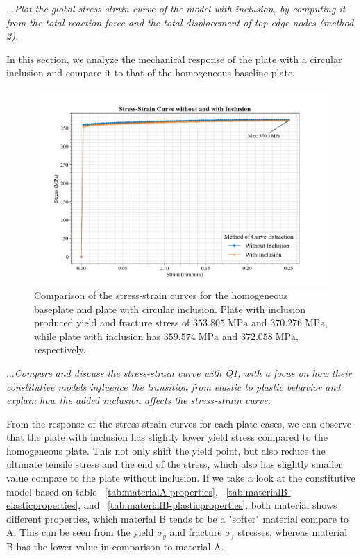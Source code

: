 \documentclass[12pt]{article}
\begin{document}
\textit{$\dots$Plot the global stress-strain curve of the model with inclusion, by computing it from the total
reaction force and the total displacement of top edge nodes (method 2).}
\vspace{1em}

In this section, we analyze the mechanical response of the plate with a circular inclusion and compare it to that of the homogeneous baseline plate.

\begin{figure}[H]
    \centering
    \includegraphics[width=1\textwidth]{visualize_tensileGraph/res/comparison_inclusion_non.png}
    \caption{Comparison of the stress-strain curves for the homogeneous baseplate and plate with circular
    inclusion. Plate with inclusion produced yield and fracture stress of $353.805 \; \text{MPa}$ and $370.276\; \text{MPa}$,
    while plate with inclusion has $359.574\; \text{MPa}$ and $372.058\; \text{MPa}$, respectively.}
    \label{fig:ComparisonInclusion}
\end{figure}


\textit{$\dots$Compare and discuss the stress-strain curve with Q1, with a focus on how their constitutive
models influence the transition from elastic to plastic behavior and explain how the added
inclusion affects the stress-strain curve.}
\vspace{1em}


\hspace{2em}From the response of the stress-strain curves for each plate cases, we can observe that the plate with inclusion
has slightly lower yield stress compared to the homogeneous plate. This not only shift the yield point, but also reduce the ultimate tensile 
stress and the end of the stress, which also has slightly smaller value compare to the plate without inclusion. If we take a look at the
constitutive model based on table ~\ref{tab:materialA-properties}, ~\ref{tab:materialB-elasticproperties}, and ~\ref{tab:materialB-plasticproperties},
both material shows different properties, which material B tends to be a "softer" material compare to A. This can be seen from the yield $\sigma_{y}$ 
and fracture $\sigma_{f}$ stresses, whereas material B has the lower value in comparison to material A. 
\end{document}
